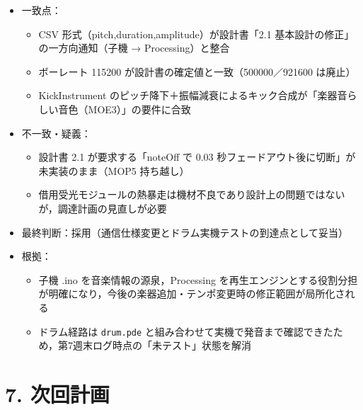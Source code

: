 \documentclass[a4paper,11pt]{ltjsarticle}
\providecommand{\％}{\%}
\begin{document}
\begin{itemize}
    \item 一致点：
    \begin{itemize}
        \item CSV 形式（pitch,duration,amplitude）が設計書「2.1 基本設計の修正」の一方向通知（子機 → Processing）と整合
        \item ボーレート 115200 が設計書の確定値と一致（500000／921600 は廃止）
        \item KickInstrument のピッチ降下＋振幅減衰によるキック合成が「楽器音らしい音色（MOE3）」の要件に合致
    \end{itemize}
    \item 不一致・疑義：
    \begin{itemize}
        \item 設計書 2.1 が要求する「noteOff で 0.03 秒フェードアウト後に切断」が未実装のまま（MOP5 持ち越し）
        \item 借用受光モジュールの熱暴走は機材不良であり設計上の問題ではないが，調達計画の見直しが必要
    \end{itemize}
    \item 最終判断：採用（通信仕様変更とドラム実機テストの到達点として妥当）
    \item 根拠：
    \begin{itemize}
        \item 子機 .ino を音楽情報の源泉，Processing を再生エンジンとする役割分担が明確になり，今後の楽器追加・テンポ変更時の修正範囲が局所化される
        \item ドラム経路は \texttt{drum.pde} と組み合わせて実機で発音まで確認できたため，第7週末ログ時点の「未テスト」状態を解消
    \end{itemize}
\end{itemize}

\section{7. 次回計画}
\end{document}
